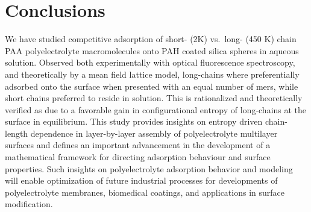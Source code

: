 \documentclass[journal=mamobx,manuscript=article]{achemso}
\begin{document}


\section{Conclusions}

We have studied competitive adsorption of short- (2K) vs.\ long- (450 K) chain PAA polyelectrolyte macromolecules onto PAH coated silica spheres in aqueous solution. Observed both experimentally with optical fluorescence spectroscopy, and theoretically by a mean field lattice model, long-chains where preferentially adsorbed onto the surface when presented with an equal number of mers, while short chains preferred to reside in solution. This is rationalized and theoretically verified as due to a favorable gain in configurational entropy of long-chains at the surface in equilibrium. This study provides insights on entropy driven chain-length dependence in layer-by-layer assembly of polyelectrolyte multilayer surfaces and defines an important advancement in the development of a mathematical framework for directing adsorption behaviour and surface properties. Such insights on polyelectrolyte adsorption behavior and modeling will enable optimization of future industrial processes for developments of polyelectrolyte membranes, biomedical coatings, and applications in surface modification.





\end{document}
